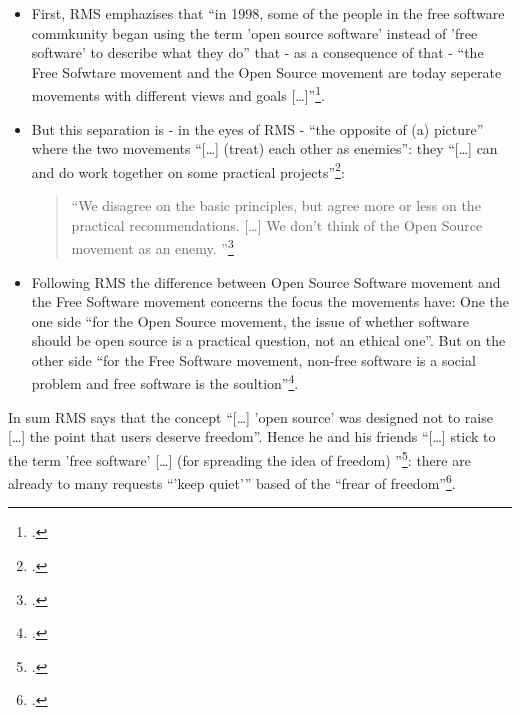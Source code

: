 \documentclass[DIV=calc,BCOR=5mm,11pt,headings=small,oneside,abstract=true, toc=bib]{scrartcl}
\begin{document}
\begin{itemize}
  \item First, RMS emphazises that \enquote{in 1998, some of the people in
  the free software commkunity began using the term 'open source software'
  instead of 'free software' to describe what they do} that - as a
  consequence of that - \enquote{the Free Sofwtare movement and the Open
  Source movement are today seperate movements with different views and
  goals [\ldots]}\footcite[cf][55]{Stallman1998a}.
  \item But this separation is - in the eyes of RMS - \enquote{the opposite
  of (a) picture} where the two movements \enquote{[\ldots] (treat)
  each other as enemies}: they \enquote{[\ldots] can and do work
  together on some practical projects}\footcite[cf][55]{Stallman1998a}:
  \begin{quote}
  \enquote{We disagree on the basic principles, but agree more or less on the
  practical recommendations. [\ldots] We don't think of the Open Source movement
  as an enemy.
  }\footcite[][55]{Stallman1998a}
  \end{quote}
  \item Following RMS the difference between Open Source Software movement and
  the Free Software movement concerns the focus the movements have: One the one
  side \enquote{for the Open Source movement, the issue of whether software
  should be open source is a practical question, not an ethical one}. But
  on the other side \enquote{for the Free Software movement, non-free
  software is a social problem and free software is the
  soultion}\footcite[][55]{Stallman1998a}.
\end{itemize}

In sum RMS says that the concept \enquote{[\ldots] 'open source' was
designed not to raise [\ldots] the point that users deserve freedom}.
Hence he and his friends \enquote{[\ldots] stick to the term 'free
software' [\ldots] (for spreading the idea of freedom)
}\footcite[][59]{Stallman1998a}: there are already to many requests
\enquote{'keep quiet'} based of the \enquote{frear of
freedom}\footcite[][57]{Stallman1998a}.

\small

\end{document}
